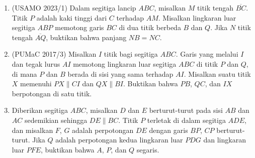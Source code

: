 \documentclass[a4paper, 11pt]{article}
\begin{document}
\begin{enumerate}
\item (USAMO 2023/1) Dalam segitiga lancip $ABC$, misalkan $M$ titik tengah $\overline{BC}$. Titik $P$ adalah kaki tinggi dari $C$ terhadap $AM$. Misalkan lingkaran luar segitiga $ABP$ memotong garis $BC$ di dua titik berbeda $B$ dan $Q$. Jika $N$ titik tengah $\overline{AQ}$, buktikan bahwa panjang $NB=NC$.
\item (PUMaC 2017/3) Misalkan $I$ titik bagi segitiga $ABC$. Garis yang melalui $I$ dan tegak lurus $AI$ memotong lingkaran luar segitiga $ABC$ di titik $P$ dan $Q$, di mana $P$ dan $B$ berada di sisi yang sama terhadap $AI$. Misalkan suatu titik $X$ memenuhi $PX\parallel CI$ dan $QX\parallel BI$. Buktikan bahwa $PB$, $QC$, dan $IX$ berpotongan di satu titik.
\item Diberikan segitiga $ABC$, misalkan $D$ dan $E$ berturut-turut pada sisi $AB$ dan $AC$ sedemikian sehingga $DE\parallel BC$. Titik $P$ terletak di dalam segitiga $ADE$, dan misalkan $F$, $G$ adalah perpotongan $DE$ dengan garis $BP$, $CP$ berturut-turut. Jika $Q$ adalah perpotongan kedua lingkaran luar $PDG$ dan lingkaran luar $PFE$, buktikan bahwa $A$, $P$, dan $Q$ segaris. 
\end{enumerate}
\end{document}
